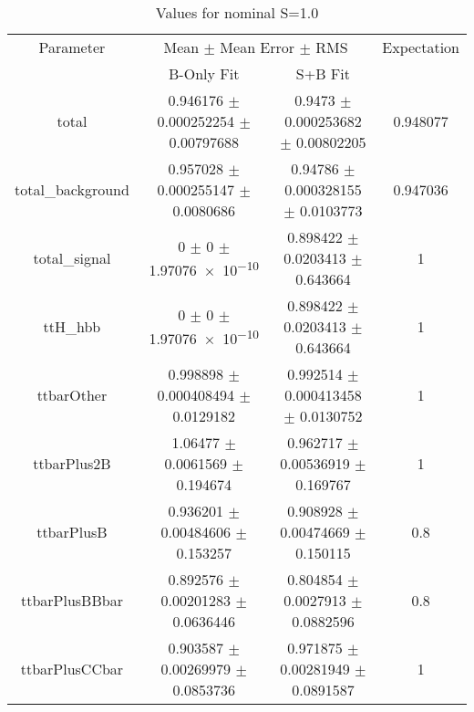 \begin{table}
\centering
\caption{Values for nominal S=1.0}
\begin{tabular}{cccc}
\toprule
Parameter & \multicolumn{2}{c}{Mean $\pm$ Mean Error $\pm$ RMS} & Expectation\\
 & B-Only Fit & S+B Fit & \\
\midrule
total & \num{0.946176} $\pm$ \num{0.000252254} $\pm$ \num{0.00797688} & \num{0.9473} $\pm$ \num{0.000253682} $\pm$ \num{0.00802205} & \num{0.948077}\\
total\_background & \num{0.957028} $\pm$ \num{0.000255147} $\pm$ \num{0.0080686} & \num{0.94786} $\pm$ \num{0.000328155} $\pm$ \num{0.0103773} & \num{0.947036}\\
total\_signal & \num{0} $\pm$ \num{0} $\pm$ \num{1.97076e-10} & \num{0.898422} $\pm$ \num{0.0203413} $\pm$ \num{0.643664} & \num{1}\\
ttH\_hbb & \num{0} $\pm$ \num{0} $\pm$ \num{1.97076e-10} & \num{0.898422} $\pm$ \num{0.0203413} $\pm$ \num{0.643664} & \num{1}\\
ttbarOther & \num{0.998898} $\pm$ \num{0.000408494} $\pm$ \num{0.0129182} & \num{0.992514} $\pm$ \num{0.000413458} $\pm$ \num{0.0130752} & \num{1}\\
ttbarPlus2B & \num{1.06477} $\pm$ \num{0.0061569} $\pm$ \num{0.194674} & \num{0.962717} $\pm$ \num{0.00536919} $\pm$ \num{0.169767} & \num{1}\\
ttbarPlusB & \num{0.936201} $\pm$ \num{0.00484606} $\pm$ \num{0.153257} & \num{0.908928} $\pm$ \num{0.00474669} $\pm$ \num{0.150115} & \num{0.8}\\
ttbarPlusBBbar & \num{0.892576} $\pm$ \num{0.00201283} $\pm$ \num{0.0636446} & \num{0.804854} $\pm$ \num{0.0027913} $\pm$ \num{0.0882596} & \num{0.8}\\
ttbarPlusCCbar & \num{0.903587} $\pm$ \num{0.00269979} $\pm$ \num{0.0853736} & \num{0.971875} $\pm$ \num{0.00281949} $\pm$ \num{0.0891587} & \num{1}\\
\bottomrule
\end{tabular}
\end{table}